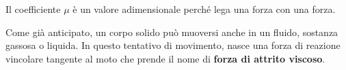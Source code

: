 \documentclass[10pt,a4paper]{book}
\begin{document}
\begin{figure}[htpb]
\end{figure}
Il coefficiente $\mu$ è un valore adimensionale perché lega una forza con una forza.

Come già anticipato, un corpo solido può muoversi anche in un fluido, sostanza gassosa o liquida. In questo tentativo di movimento, nasce una forza di reazione vincolare tangente al moto che prende il nome di \textbf{forza di attrito viscoso}.
\end{document}
